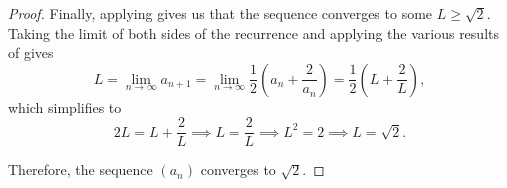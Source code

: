 \begin{problem}
\begin{proof}
    Finally, applying  gives us that the
    sequence converges to some $L \geq \sqrt{2}$. Taking the limit of both
    sides of the recurrence and applying the various results of
     gives
    \[
      L = \lim_{n \to \infty} a_{n+1} = \lim_{n \to \infty} \frac{1}{2} \left( a_n + \frac{2}{a_n} \right)
      = \frac{1}{2} \left( L + \frac{2}{L} \right),
    \]
    which simplifies to
    \[
      2L = L + \frac{2}{L} \implies L = \frac{2}{L} \implies L^2 = 2 \implies L = \sqrt{2}.
    \]

    Therefore, the sequence $(a_n)$ converges to $\sqrt{2}$.
  \end{proof}
\end{problem}
